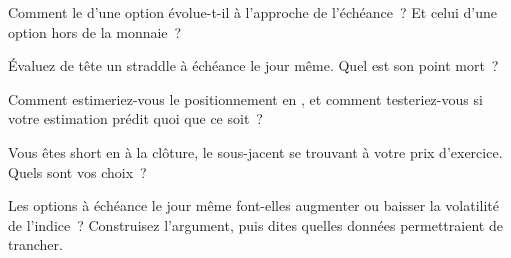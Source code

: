\begin{interviewq}\label{iq:m1:zero-day-options-and-retail-flow:2}
Comment le  d'une option  évolue-t-il à l'approche de l'échéance~?
Et celui d'une option hors de la monnaie~?
\end{interviewq}

\begin{interviewq}\label{iq:m1:zero-day-options-and-retail-flow:3}
Évaluez de tête un straddle  à échéance le jour même. Quel est son point mort~?
\end{interviewq}

\begin{interviewq}\label{iq:m1:zero-day-options-and-retail-flow:4}
Comment estimeriez-vous le positionnement en , et comment testeriez-vous
si votre estimation prédit quoi que ce soit~?
\end{interviewq}

\begin{interviewq}\label{iq:m1:zero-day-options-and-retail-flow:5}
Vous êtes short en  à la clôture, le sous-jacent se trouvant à votre prix d'exercice.
Quels sont vos choix~?
\end{interviewq}

\begin{interviewq}\label{iq:m1:zero-day-options-and-retail-flow:6}
Les options à échéance le jour même font-elles augmenter ou baisser la volatilité de l'indice~? Construisez
l'argument, puis dites quelles données permettraient de trancher.
\end{interviewq}
